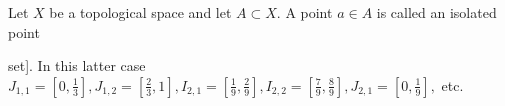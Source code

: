 Let $X$ be a topological space and let $A \subset X$. A point $a \in A$ is called an isolated point

set]. In this latter case $J_{1,1} = \left[0, \frac{1}{3}\right], J_{1,2} = \left[\frac{2}{3}, 1\right], I_{2,1} = \left[\frac{1}{9}, \frac{2}{9}\right], I_{2,2} = \left[\frac{7}{9}, \frac{8}{9}\right], J_{2,1} = \left[0, \frac{1}{9}\right],$ etc.